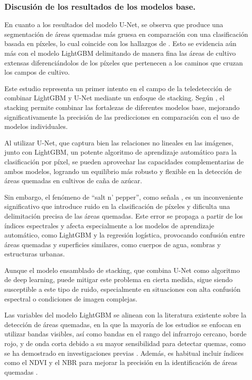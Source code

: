 \subsubsection{Discusión de los resultados de los modelos base.}
En cuanto a los resultados del modelo U-Net, se observa que produce una segmentación de áreas quemadas más gruesa en comparación con una clasificación basada en píxeles, lo cual coincide con los hallazgos de 
\citet{knopp_deep_2020}. Esto se evidencia aún más con el modelo LightGBM delimitando de manera fina las áreas de cultivo extensas diferenciándolos de los píxeles que pertenecen a los caminos que cruzan los campos de cultivo.

Este estudio representa un primer intento en el campo de la teledetección de combinar LightGBM y U-Net mediante un enfoque de stacking. Según \citet{zhang_review_2022}, el stacking 
permite combinar las fortalezas de diferentes modelos base, mejorando significativamente la precisión de las predicciones en comparación con el uso de modelos individuales. 

Al utilizar U-Net, que captura bien las relaciones no lineales en las imágenes, junto con LightGBM, un potente algoritmo de aprendizaje automático para la clasificación por píxel, se pueden aprovechar las capacidades complementarias de ambos modelos, logrando 
un equilibrio más robusto y flexible en la detección de áreas quemadas en cultivos de caña de azúcar. 

Sin embargo, el fenómeno de ``salt n' pepper'', como señala \citet{sdraka_floga_2024}, es un inconveniente significativo que introduce ruido en la clasificación de píxeles y dificulta una delimitación precisa de las áreas quemadas. Este error se propaga a partir 
de los índices espectrales y afecta especialmente a los modelos de aprendizaje automático, como LightGBM y la regresión logística, provocando confusión entre áreas quemadas y superficies similares, como cuerpos de agua, sombras y estructuras urbanas. 

Aunque el modelo ensamblado de stacking, que combina U-Net como algoritmo de deep learning, puede mitigar este problema en cierta medida, sigue siendo susceptible a este tipo de ruido, especialmente en situaciones con alta confusión espectral o condiciones de imagen 
complejas.

Las variables del modelo LightGBM se alinean con la literatura existente sobre la detección de áreas quemadas, en la que la mayoría de los estudios se enfocan en utilizar bandas visibles, así como bandas en el rango del infrarrojo cercano, borde rojo, y de onda corta
debido a su mayor sensibilidad para detectar quemas, como se ha demostrado en investigaciones previas \citep{van_dijk_spectral_2021,QUINTANO20111597}. Además, es habitual incluir índices como el NDVI y el NBR para mejorar la precisión en la identificación de áreas quemadas \citep{lee_machine_2022}. 

